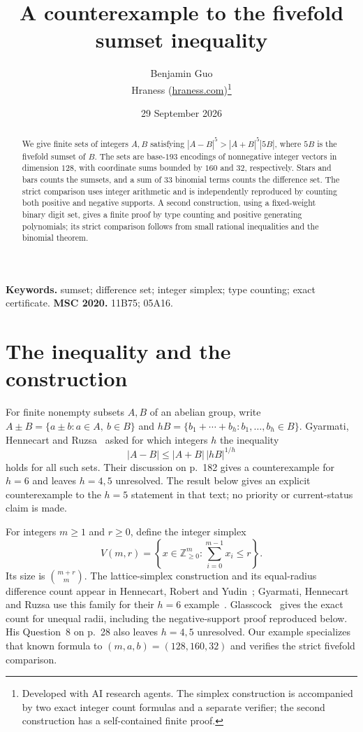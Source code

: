 \documentclass[11pt,a4paper]{article}
\title{A counterexample to the fivefold sumset inequality}
\author{Benjamin Guo\\Hraness (\url{hraness.com})\thanks{Developed with AI research agents. The simplex construction is accompanied by two exact integer count formulas and a separate verifier; the second construction has a self-contained finite proof.}}
\date{29 September 2026}
\newcommand{\Z}{\mathbb Z}
\newcommand{\V}{V}
\begin{document}
\maketitle
\begin{abstract}
We give finite sets of integers $A,B$ satisfying
$|A-B|^5>|A+B|^5|5B|$, where $5B$ is the fivefold sumset of $B$.
The sets are base-$193$ encodings of nonnegative integer vectors in
dimension $128$, with coordinate sums bounded by $160$ and $32$,
respectively. Stars and bars counts the sumsets, and a sum of $33$
binomial terms counts the difference set. The strict comparison uses
integer arithmetic and is independently reproduced by counting both
positive and negative supports.
A second construction, using a fixed-weight binary digit set, gives a
finite proof by type counting and positive generating polynomials; its
strict comparison follows from small rational inequalities and the
binomial theorem.
\end{abstract}
\medskip\noindent\textbf{Keywords.} sumset; difference set; integer simplex; type counting; exact certificate.
\smallskip\noindent\textbf{MSC 2020.} 11B75; 05A16.

\section{The inequality and the construction}
For finite nonempty subsets $A,B$ of an abelian group, write
$A\pm B=\{a\pm b:a\in A,\ b\in B\}$ and
$hB=\{b_1+\cdots+b_h:b_1,\ldots,b_h\in B\}$.
Gyarmati, Hennecart and Ruzsa~\cite[equation~(9), p.~177]{ghr} asked for which
integers $h$ the inequality
\begin{equation}\label{eq:historical}
 |A-B|\le |A+B|\,|hB|^{1/h}
\end{equation}
holds for all such sets. Their discussion on p.~182 gives a counterexample
for $h=6$ and leaves $h=4,5$ unresolved. The result below gives an
explicit counterexample to the $h=5$ statement in that text; no priority
or current-status claim is made.

For integers $m\ge1$ and $r\ge0$, define the integer simplex
\[
 \V(m,r)=\left\{x\in\Z_{\ge0}^{m}:
                  \sum_{i=0}^{m-1}x_i\le r\right\}.
\]
Its size is $\binom{m+r}{m}$. The lattice-simplex construction and its
equal-radius difference count appear in Hennecart, Robert and
Yudin~\cite[Section~3]{hry}; Gyarmati, Hennecart and Ruzsa use this family
for their $h=6$ example~\cite[p.~182]{ghr}.
Glasscock~\cite[Lemma~B.1, pp.~37--38]{glasscock} gives the exact count
for unequal radii, including the negative-support proof reproduced below.
His Question~8 on p.~28 also leaves $h=4,5$ unresolved.
Our example specializes that known formula to $(m,a,b)=(128,160,32)$
and verifies the strict fivefold comparison.
\end{document}
